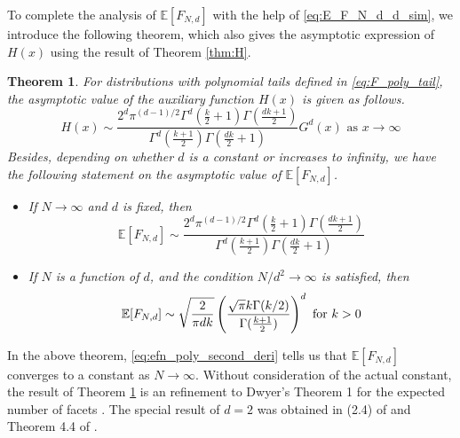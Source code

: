 \documentclass[conference,a4paper]{IEEEtran}
\def\E{\mathbb{E}}
\newtheorem{theorem}{Theorem}
\begin{document}
To complete the analysis of $\E[F_{N,d}]$ with the help of \eqref{eq:E_F_N_d_d_sim},
we introduce the following theorem, which also gives the asymptotic
expression of $H(x)$ using the result of Theorem \ref{thm:H}.
\begin{theorem}\label{thm:poly_tails}
     For distributions with polynomial tails defined in \eqref{eq:F_poly_tail},
     the asymptotic value of the auxiliary function $H(x)$ is given as follows.
     \begin{equation}\label{eq:H_poly_tail_exp}
          H(x) \sim \frac{2^d \pi^{(d-1)/2}\Gamma^d(\frac{k}{2}+1)
          \Gamma(\frac{dk+1}{2})}{
              \Gamma^d(\frac{k+1}{2}) \Gamma(\frac{dk}{2}+1)} G^d (x)
              \textrm{ as } x\to \infty
     \end{equation}
     Besides, depending on whether $d$ is a constant or increases to infinity,
     we have the following statement on
     the asymptotic value of $\E[F_{N,d}]$.
     \begin{itemize}
          \item If $N \to \infty$ and $d$ is fixed, then
     \begin{equation}\label{eq:efn_poly_second_deri}
    \E[F_{N,d}] \sim \frac{2^d \pi^{(d-1)/2}\Gamma^d(\frac{k}{2}+1)
    \Gamma(\frac{dk+1}{2})}{
        \Gamma^d(\frac{k+1}{2}) \Gamma(\frac{dk}{2}+1)}
     \end{equation}
\item
If $N$ is a function of $d$, and the condition $N/d^2 \to \infty$ is satisfied, then
\begin{equation}\label{eq:poly_E_F_{N,d}_d_infty}
\E[F_{N,d}] \sim \sqrt{\frac{2}{\pi dk}}\left(
      \frac{\sqrt{\pi}k \Gamma(k/2)}
     {\Gamma(\frac{k+1}{2})}
 \right)^d \textrm{ for } k>0
\end{equation}
\end{itemize}
\end{theorem}
In the above theorem, \eqref{eq:efn_poly_second_deri} tells
us that $\E[F_{N,d}]$ converges to a constant as $N \to \infty$.
Without consideration of the actual constant, the result of
Theorem \ref{thm:poly_tails} is an refinement to Dwyer's Theorem 1 for the expected number of facets \cite{dwyer1991convex}.
The special result of $d=2$ was obtained in (2.4) of \cite{carnal1970konvexe}
and Theorem 4.4 of \cite{davis1987convex}.
\end{document}
